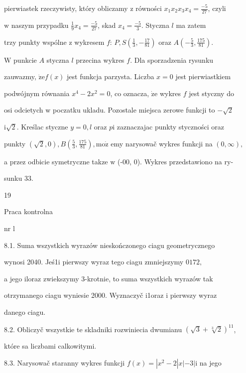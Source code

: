 \documentclass[a4paper,12pt]{article}
\begin{document}
pierwiastek rzeczywisty, który obliczamy $\mathrm{z}$ równości $x_{1}x_{2}x_{3}x_{4}=\displaystyle \frac{-5}{27}$, czyli

$\mathrm{w}$ naszym przypadku $\displaystyle \frac{1}{9}x_{4} = \displaystyle \frac{-5}{27}$, skad $x_{4} = \displaystyle \frac{-5}{3}$. Styczna $l$ ma zatem

trzy punkty wspólne $\mathrm{z}$ wykresem $f$: $P, S(\displaystyle \frac{1}{3},-\frac{17}{81})$ oraz $A(-\displaystyle \frac{5}{3},\frac{175}{81}).$

$\mathrm{W}$ punkcie $A$ styczna $l$ przecina wykres $f$. Dla sporzadzenia rysunku

zauwazmy, $\dot{\mathrm{z}}\mathrm{e}f(x)$ jest funkcja parzysta. Liczba $x=0$ jest pierwiastkiem

podwójnym równania $x^{4}-2x^{2}=0$, co oznacza, $\dot{\mathrm{z}}\mathrm{e}$ wykres $f$ jest styczny do

osi odcietych $\mathrm{w}$ poczatku ukladu. Pozostale miejsca zerowe funkcji to $-\sqrt{2}$

$\mathrm{i}\sqrt{2}$. Kreślac styczne $y=0, l$ oraz $p\mathrm{i}$ zaznaczajac punkty styczności oraz

punkty $(\sqrt{2},0), B(\displaystyle \frac{5}{3},\frac{175}{81}), \mathrm{m}\mathrm{o}\dot{\mathrm{z}}$ emy narysowač wykres funkcji na $(0,\infty),$

a przez odbicie symetryczne takze $\mathrm{w}$ (-00, 0). Wykres przedstawiono na ry-

sunku 33.





19

Praca kontrolna

nr l

8.1. Suma wszystkich wyrazów nieskończonego ciagu geometrycznego

wynosi 2040. Jeś1i pierwszy wyraz tego ciagu zmniejszymy $0 172,$

a jego iloraz zwiekszymy 3-krotnie, to suma wszystkich wyrazów tak

otrzymanego ciagu wyniesie 2000. Wyznaczyč i1oraz $\mathrm{i}$ pierwszy wyraz

danego ciagu.

8.2. Obliczyč wszystkie te skladniki rozwiniecia dwumianu $(\sqrt{3}+\sqrt[3]{2})^{11}$,

które sa liczbami calkowitymi.

8.3. Narysowač staranny wykres funkcji $f(x) = |x^{2}-2|x|-3| \mathrm{i}$ na jego
\end{document}
